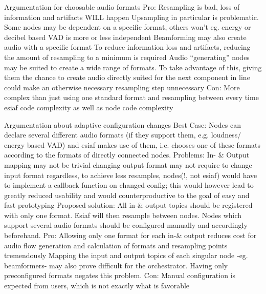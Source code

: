 Argumentation for choosable audio formats
Pro:
Resampling is bad, loss of information and artifacts WILL happen
Upsampling in particular is problematic.
Some nodes may be dependent on a specific format, others won’t
eg. energy or decibel based VAD is more or less independent
Beamforming may also create audio with a specific format
To reduce information loss and artifacts, reducing the amount of resampling to a minimum is required
Audio “generating” nodes may be suited to create a wide range of formats. To take advantage of this, giving them the chance to create audio directly suited for the next component in line could make an otherwise necessary resampling step unnecessary
Con:
More complex than just using one standard format and resampling between every time
esiaf code complexity as well as node code complexity


Argumentation about adaptive configuration changes
Best Case: Nodes can declare several different audio formats (if they support them, e.g. loudness/ energy based VAD) and esiaf makes use of them, i.e. chooses one of these formats according to the formats of directly connected nodes.
Problems: 
In- \& Output mapping may not be trivial
changing output format may not require to change input format
regardless, to achieve less resamples, nodes(!, not esiaf) would have to implement a callback function on changed config; this would however lead to greatly reduced usability and would counterproductive to the goal of easy and fast prototyping
Proposed solution: 
All in-\& output topics should be registered with only one format. Esiaf will then resample between nodes. Nodes which support several audio formats should be configured manually and accordingly beforehand. 
Pro:
Allowing only one format for each in-\& output reduces cost for audio flow generation and calculation of formats and resampling points tremendously
Mapping the input and output topics of each singular node -eg. beamformers- may also prove difficult for the orchestrator. Having only preconfigured formats negates this problem.
Con:
Manual configuration is expected from users, which is not exactly what is favorable

